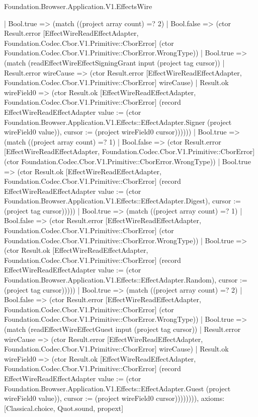 \begin{lexlean}{Foundation.Browser.Application.V1.EffectsWire}
\begin{semanticmodule}
{              | Bool.true => (match ((project array count) =? 2)
                | Bool.false => (ctor Result.error [EffectWireReadEffectAdapter, Foundation.Codec.Cbor.V1.Primitive::CborError] (ctor Foundation.Codec.Cbor.V1.Primitive::CborError.WrongType))
                | Bool.true => (match (readEffectWireEffectSigningGrant input (project tag cursor))
                  | Result.error wireCause => (ctor Result.error [EffectWireReadEffectAdapter, Foundation.Codec.Cbor.V1.Primitive::CborError] wireCause)
                  | Result.ok wireField0 => (ctor Result.ok [EffectWireReadEffectAdapter, Foundation.Codec.Cbor.V1.Primitive::CborError] (record EffectWireReadEffectAdapter {value := (ctor Foundation.Browser.Application.V1.Effects::EffectAdapter.Signer (project wireField0 value)), cursor := (project wireField0 cursor)})))))
            | Bool.true => (match ((project array count) =? 1)
              | Bool.false => (ctor Result.error [EffectWireReadEffectAdapter, Foundation.Codec.Cbor.V1.Primitive::CborError] (ctor Foundation.Codec.Cbor.V1.Primitive::CborError.WrongType))
              | Bool.true => (ctor Result.ok [EffectWireReadEffectAdapter, Foundation.Codec.Cbor.V1.Primitive::CborError] (record EffectWireReadEffectAdapter {value := (ctor Foundation.Browser.Application.V1.Effects::EffectAdapter.Digest), cursor := (project tag cursor)}))))
          | Bool.true => (match ((project array count) =? 1)
            | Bool.false => (ctor Result.error [EffectWireReadEffectAdapter, Foundation.Codec.Cbor.V1.Primitive::CborError] (ctor Foundation.Codec.Cbor.V1.Primitive::CborError.WrongType))
            | Bool.true => (ctor Result.ok [EffectWireReadEffectAdapter, Foundation.Codec.Cbor.V1.Primitive::CborError] (record EffectWireReadEffectAdapter {value := (ctor Foundation.Browser.Application.V1.Effects::EffectAdapter.Random), cursor := (project tag cursor)}))))
        | Bool.true => (match ((project array count) =? 2)
          | Bool.false => (ctor Result.error [EffectWireReadEffectAdapter, Foundation.Codec.Cbor.V1.Primitive::CborError] (ctor Foundation.Codec.Cbor.V1.Primitive::CborError.WrongType))
          | Bool.true => (match (readEffectWireEffectGuest input (project tag cursor))
            | Result.error wireCause => (ctor Result.error [EffectWireReadEffectAdapter, Foundation.Codec.Cbor.V1.Primitive::CborError] wireCause)
            | Result.ok wireField0 => (ctor Result.ok [EffectWireReadEffectAdapter, Foundation.Codec.Cbor.V1.Primitive::CborError] (record EffectWireReadEffectAdapter {value := (ctor Foundation.Browser.Application.V1.Effects::EffectAdapter.Guest (project wireField0 value)), cursor := (project wireField0 cursor)}))))))),
  axioms: [Classical.choice, Quot.sound, propext]
}


\end{semanticmodule}
\end{lexlean}
